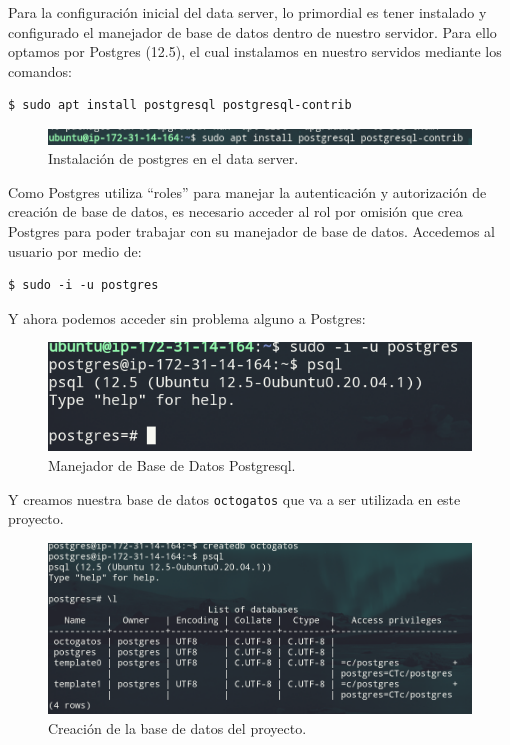 \documentclass{article}
\newcommand{\ttt}[1]{%
\texttt{#1}%
}
\begin{document}
Para la configuración inicial del data server, lo primordial es tener
instalado y configurado el manejador de base de datos dentro de nuestro 
servidor. Para ello optamos por Postgres (12.5), el cual instalamos 
en nuestro servidos mediante los comandos:

\begin{lstlisting}
$ sudo apt install postgresql postgresql-contrib
\end{lstlisting}

\begin{figure}[H]
  \centering
  \includegraphics[width=\textwidth]{DATASERVER/exhibitA}
  \caption{Instalación de postgres en el data server.}
  \label{fig:DATASERVER-A}
\end{figure}

Como Postgres utiliza ``roles'' para manejar la autenticación y 
autorización de creación de base de datos, es necesario acceder 
al rol por omisión que crea Postgres para poder trabajar con su 
manejador de base de datos. Accedemos al usuario por medio de:

\begin{lstlisting}
$ sudo -i -u postgres
\end{lstlisting}

Y ahora podemos acceder sin problema alguno a Postgres:

\begin{figure}[H]
  \centering
  \includegraphics[width=\textwidth]{DATASERVER/exhibitB}
  \caption{Manejador de Base de Datos Postgresql.}
  \label{fig:DATASERVER-B}
\end{figure}

Y creamos nuestra base de datos \ttt{octogatos} que va a ser 
utilizada en este proyecto.

\begin{figure}[H]
  \centering
  \includegraphics[width=\textwidth]{DATASERVER/exhibitC}
  \caption{Creación de la base de datos del proyecto.}
  \label{fig:DATASERVER-C}
\end{figure}
\end{document}
